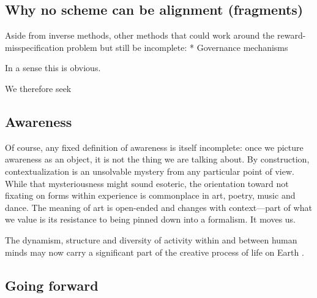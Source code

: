 \subsection{Why no scheme can be alignment (fragments)}

Aside from inverse methods, other methods that could work around the reward-misspecification problem but still be incomplete:
* Governance mechanisms

In a sense this is obvious.

We therefore seek


\subsection{Awareness}

Of course, any fixed definition of awareness is itself incomplete: once we picture awareness as an object, it is not the thing we are talking about. By construction, contextualization is an unsolvable mystery from any particular point of view. While that mysteriousness might sound esoteric, the orientation toward not fixating on forms within experience is commonplace in art, poetry, music and dance. The meaning of art is open-ended and changes with context---part of what we value is its resistance to being pinned down into a formalism. It moves us.

The dynamism, structure and diversity of activity within and between human minds may now carry a significant part of the creative process of life on Earth \citep{popper1972objective}.


\subsection{Going forward}

